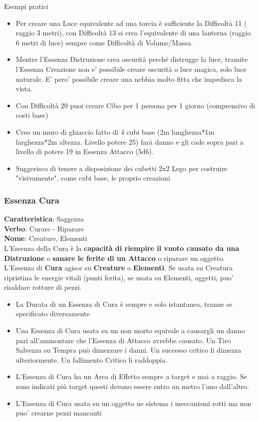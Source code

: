 \documentclass[a4paper,10 pt,twoside,openany]{book}
\begin{document}
Esempi pratici
\begin{itemize}
	\item Per creare una Luce equivalente ad una torcia è sufficiente la Difficoltà 11 ( raggio 3 metri), con Difficoltà 13 si crea l'equivalente di una lanterna (raggio 6 metri di luce) sempre come Difficoltà di Volume/Massa.
	\item Mentre l'Essenza Distruzione crea oscurità perché distrugge la luce, tramite l'Essenza Creazione non e' possibile creare oscurità o luce magica, solo luce naturale. E' pero' possibile creare una nebbia molto fitta che impedisca la vista.
	\item Con Difficoltà 20 puoi creare Cibo per 1 persona per 1 giorno (comprensivo di costi base)
	\item Creo un muro di ghiaccio fatto di 4 cubi base (2m lunghezza{*}1m larghezza{*}2m altezza. Livello potere 25) farà danno e gli cade sopra pari a livello di potere 19 in Essenza Attacco (5d6).
	\item Suggerisco di tenere a disposizione dei cubetti 2x2 Lego per costruire "visivamente", come cubi base, le proprio creazioni
\end{itemize}

\pagebreak

\subsubsection{Essenza Cura}

\label{essenza-cura---volonta}


\textbf{Caratteristica}: Saggezza\\
\textbf{Verbo}: Curare - Riparare\\
\textbf{Nome}: Creature, Elementi\\

L'Essenza della Cura è la \textbf{capacità di riempire il vuoto causato da una Distruzione} o \textbf{sanare le ferite di un Attacco} o riparare un oggetto. L'Essenza di \textbf{Cura} agisce su \textbf{Creature} o \textbf{Elementi}. Se usata su Creatura ripristina le energie vitali (punti ferita), se usata su Elementi, oggetti, puo' risaldare rotture di pezzi.


\begin{itemize}
	\item
	La Durata di un Essenza di Cura è sempre e solo istantanea, tranne se specificato diversamente
	\item
	Una Essenza di Cura usata su un non morto equivale a causargli un danno pari all'ammontare che l'Essenza di Attacco avrebbe causato. Un Tiro Salvezza su Tempra può dimezzare i danni. Un successo critico li dimezza ulteriormente. Un fallimento Critico li raddoppia.
	\item
	L'Essenza di Cura ha un Area di Effetto sempre a target e mai a raggio. Se sono indicati più target questi devono essere entro un metro l'uno dall'altro.
	\item
	L'Essenza di Cura usata su un oggetto ne sistema i meccanismi rotti ma non puo' crearne pezzi mancanti
\end{itemize}
\end{document}
